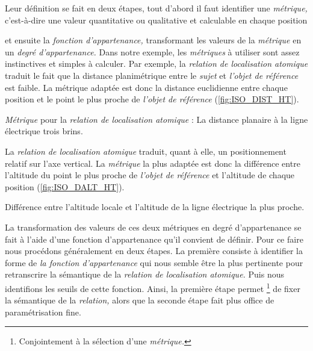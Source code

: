 Leur définition se fait en deux étapes,
tout d'abord il faut identifier une \emph{métrique,} c'est-à-dire une
valeur quantitative ou qualitative et calculable en chaque position 

et ensuite la \emph{fonction d'appartenance,} transformant les valeurs
de la \emph{métrique} en un \emph{degré d'appartenance.} Dans notre
exemple, les \emph{métriques} à utiliser sont assez instinctives et
simples à calculer. Par exemple, la \emph{relation de localisation
  atomique}
traduit le fait que la distance planimétrique entre le \emph{sujet} et
\emph{l'objet de référence} est faible. La métrique adaptée est donc
la distance euclidienne entre chaque position et le point le plus
proche de \emph{l'objet de référence} (\autoref{fig:ISO_DIST_HT}).

\begin{carte}
  \centering
  
  \caption{\emph{Métrique} pour la \emph{relation de localisation
      atomique}
    \protect{}
    : La distance planaire à la ligne électrique trois brins.}
  \label{fig:ISO_DIST_HT}
\end{carte}

La \emph{relation de localisation atomique}
 traduit,
quant à elle, un positionnement relatif sur l'axe vertical. La
\emph{métrique} la plus adaptée est donc la différence entre
l'altitude du point le plus proche de \emph{l'objet de référence} et
l'altitude de chaque position (\autoref{fig:ISO_DALT_HT}).

\begin{carte}
  \centering
  
  \caption{Différence entre l'altitude locale et l'altitude de la
    ligne électrique la plus proche.}
  \label{fig:ISO_DALT_HT}
\end{carte}

La transformation des valeurs de ces deux métriques en degré
d'appartenance se fait à l'aide d'une fonction d'appartenance qu'il
convient de définir. Pour ce faire nous procédons généralement en deux
étapes. La première consiste à identifier la forme de \emph{la
  fonction d'appartenance} qui nous semble être la plus pertinente
pour retranscrire la sémantique de la \emph{relation de localisation
  atomique.} Puis nous identifions les seuils de cette
fonction. Ainsi, la première étape permet \footnote{Conjointement à la
  sélection d'une \emph{métrique.}} de fixer la sémantique de la
\emph{relation,} alors que la seconde étape fait plus office de
paramétrisation fine.

